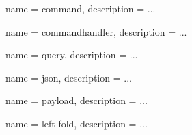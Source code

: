 {
  name = command,
  description = {...}
}

{
  name = commandhandler,
  description = {...}
}

{
  name = query,
  description = {...}
}

{
  name = json,
  description = {...}
}

{
  name = payload,
  description = {...}
}

{
  name = left fold,
  description = {...}
}


\printglossary[type=\acronymtype,title={Lijst van acroniemen}]

\printglossary
{}

